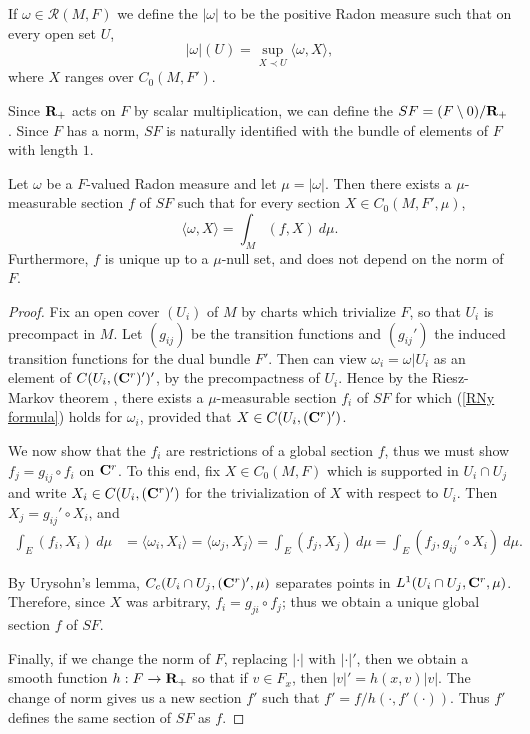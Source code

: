\begin{definition}
If $\omega \in \mathcal R(M, F)$ we define the  $|\omega|$ to be the positive Radon measure such that on every open set $U$,
$$|\omega|(U) = \sup_{X \prec U} \langle \omega, X\rangle,$$
where $X$ ranges over $C_0(M, F')$.
\end{definition}

Since $\mathbf{R}_+$ acts on $F$ by scalar multiplication, we can define the  $SF = (F \setminus 0)/\mathbf{R}_+$.
Since $F$ has a norm, $SF$ is naturally identified with the bundle of elements of $F$ with length $1$.

\begin{proposition}\label{HanhJordan}
Let $\omega$ be a $F$-valued Radon measure and let $\mu = |\omega|$.
Then there exists a $\mu$-measurable section $f$ of $SF$ such that for every section $X \in C_0(M, F', \mu)$,
\begin{equation}\label{RNy formula}
\langle \omega, X\rangle = \int_M (f, X) ~d\mu.
\end{equation}
Furthermore, $f$ is unique up to a $\mu$-null set, and does not depend on the norm of $F$.
\end{proposition}
\begin{proof}
Fix an open cover $(U_i)$ of $M$ by charts which trivialize $F$, so that $U_i$ is precompact in $M$.
Let $(g_{ij})$ be the transition functions and $(g_{ij}')$ the induced transition functions for the dual bundle $F'$.
Then can view $\omega_i = \omega|U_i$ as an element of $C(U_i, (\mathbf{C}^r)')'$, by the precompactness of $U_i$.
Hence by the Riesz-Markov theorem \cite[Theorem 4.14]{simon1983GMT}, there exists a $\mu$-measurable section $f_i$ of $SF$ for which (\ref{RNy formula}) holds for $\omega_i$, provided that $X \in C(U_i, (\mathbf{C}^r)')$.

We now show that the $f_i$ are restrictions of a global section $f$, thus we must show $f_j = g_{ij} \circ f_i$ on $\mathbf{C}^r$.
To this end, fix $X \in C_0(M, F)$ which is supported in $U_i \cap U_j$ and write $X_i \in C(U_i, (\mathbf{C}^r)')$ for the trivialization of $X$ with respect to $U_i$.
Then $X_j = g_{ij}' \circ X_i$, and
\begin{align*}
\int_E (f_i, X_i) ~d\mu &= \langle \omega_i, X_i\rangle = \langle \omega_j, X_j\rangle = \int_E (f_j, X_j) ~d\mu = \int_E (f_j, g_{ij}' \circ X_i) ~d\mu.
\end{align*}

By Urysohn's lemma, $C_c(U_i \cap U_j, (\mathbf{C}^r)', \mu)$ separates points in $L^1(U_i \cap U_j, \mathbf{C}^r, \mu)$.
Therefore, since $X$ was arbitrary, $f_i = g_{ji} \circ f_j$; thus we obtain a unique global section $f$ of $SF$.

Finally, if we change the norm of $F$, replacing $|\cdot|$ with $|\cdot|'$, then we obtain a smooth function $h: F \to \mathbf{R}_+$ so that if $v \in F_x$, then $|v|' = h(x, v)|v|$.
The change of norm gives us a new section $f'$ such that $f' = f/h(\cdot, f'(\cdot))$.
Thus $f'$ defines the same section of $SF$ as $f$.
\end{proof}

